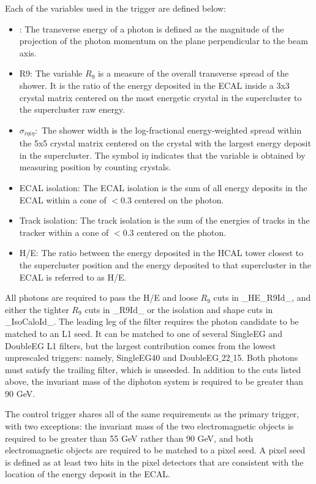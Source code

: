 Each of the variables used in the trigger are defined below:

\begin{itemize}
\item{\ET:} The transverse energy \ET of a photon is defined
as the magnitude of the projection
of the photon momentum on the plane perpendicular to the beam axis.
\item{R9:} The variable $R_9$ is
a measure of the overall transverse spread of the shower. It is the ratio
of the energy deposited in the ECAL inside a 3x3 crystal matrix centered on
the most energetic crystal in the supercluster to the supercluster
 raw energy.
\item{$\sigma_{i\eta i \eta}:$} The shower width \sigmaietaieta is
      the log-fractional energy-weighted spread within the 5x5 crystal matrix centered on the
      crystal with the largest energy deposit in the supercluster. The symbol
      i$\eta$ indicates that the variable is obtained by measuring position by
      counting crystals.
\item{ECAL isolation:} The ECAL isolation is
      the sum of all energy deposits in the ECAL within a cone of \dR
      $<$0.3 centered on the photon.
\item{Track isolation:} The track isolation is
      the sum of the energies of tracks in the tracker within a cone of \dR
      $<$0.3 centered on the photon.
\item{H/E:} The ratio between the energy deposited in the HCAL
      tower closest to the supercluster position and the energy deposited to
      that supercluster in the ECAL is referred to as H/E.
  \end{itemize}

All photons are required to pass the H/E and loose $R_9$ cuts in
\_HE\_R9Id\_, and either the tighter $R_9$ cuts in
\_R9Id\_ or the isolation and shape cuts in \_IsoCaloId\_.
The leading leg of the filter requires the photon candidate
to be matched to an L1 seed. It can be matched to one of several
SingleEG and DoubleEG L1 filters, but the largest contribution comes
from the lowest unprescaled triggers: namely, SingleEG40 and
DoubleEG$\_$22$\_$15.
Both photons must satisfy the trailing filter, which is unseeded.
In addition to the cuts listed above, the invariant mass of
the diphoton system is required to be greater than 90 GeV.

The control trigger shares all of the same requirements as the primary trigger, with two exceptions: 
the invariant mass of the two electromagnetic objects is required to be greater than 55 GeV rather than 90 GeV, 
and both electromagnetic objects are required to be matched to a pixel seed. A pixel seed is defined
as at least two hits in the pixel detectors that are consistent with the location of the energy deposit in the ECAL. 

